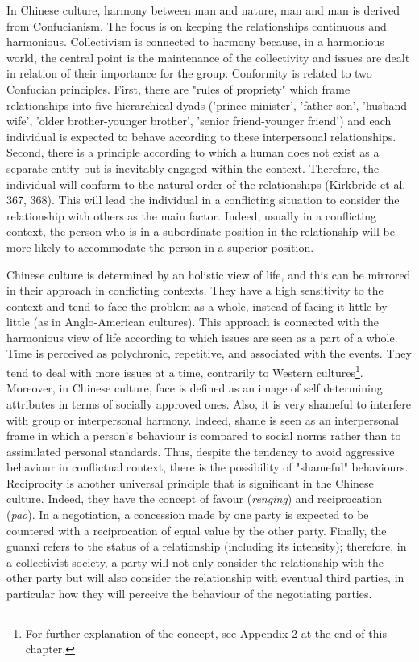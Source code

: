 \documentclass[../main.tex]{subfiles}
\begin{document}
In Chinese culture, harmony between man and nature, man and man is derived from Confucianism. The focus is on keeping the relationships continuous and harmonious. Collectivism is connected to harmony because, in a harmonious world, the central point is the maintenance of the collectivity and issues are dealt in relation of their importance for the group. Conformity is related to two Confucian principles. First, there are "rules of propriety" which frame relationships into five hierarchical dyads ('prince-minister', 'father-son', 'husband-wife', 'older brother-younger brother', 'senior friend-younger friend') and each individual is expected to behave according to these interpersonal relationships. Second, there is a principle according to which a human does not exist as a separate entity but is inevitably engaged within the context. Therefore, the individual will conform to the natural order of the relationships (Kirkbride et al. 367, 368). This will lead the individual in a conflicting situation to consider the relationship with others as the main factor. Indeed, usually in a conflicting context, the person who is in a subordinate position in the relationship will be more likely to accommodate the person in a superior position.

Chinese culture is determined by an holistic view of life, and this can be mirrored in their approach in conflicting contexts. They have a high sensitivity to the context and tend to face the problem as a whole, instead of facing it little by little (as in Anglo-American cultures). This approach is connected with the harmonious view of life according to which issues are seen as a part of a whole. Time is perceived as polychronic, repetitive, and associated with the events. They tend to deal with more issues at a time, contrarily to Western cultures\footnote{For further explanation of the concept, see Appendix 2 at the end of this chapter.}. Moreover, in Chinese culture, face is defined as an image of self determining attributes in terms of socially approved ones. Also, it is very shameful to interfere with group or interpersonal harmony. Indeed, shame is seen as an interpersonal frame in which a person's behaviour is compared to social norms rather than to assimilated personal standards. Thus, despite the tendency to avoid aggressive behaviour in conflictual context, there is the possibility of "shameful" behaviours. Reciprocity is another universal principle that is significant in the Chinese culture. Indeed, they have the concept of favour (\textit{renging}) and reciprocation (\textit{pao}). In a negotiation, a concession made by one party is expected to be countered with a reciprocation of equal value by the other party. Finally, the guanxi refers to the status of a relationship (including its intensity); therefore, in a collectivist society, a party will not only consider the relationship with the other party but will also consider the relationship with eventual third parties, in particular how they will perceive the behaviour of the negotiating parties.
\end{document}
